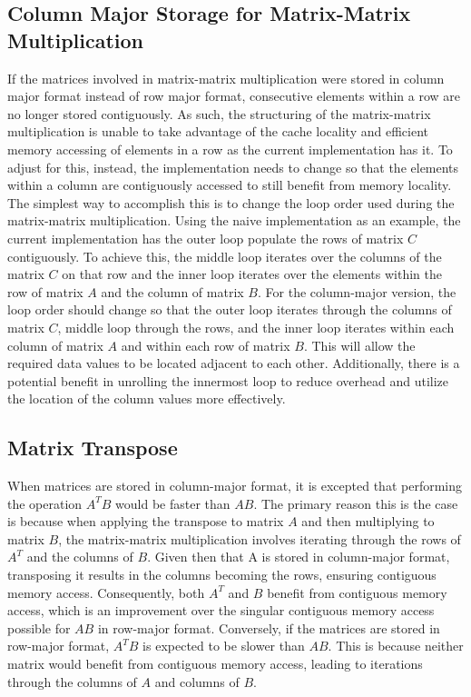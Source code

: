 \documentclass{article}
\begin{document}
\subsection{Column Major Storage for Matrix-Matrix Multiplication}
If the matrices involved in matrix-matrix multiplication were stored in column major format instead of row major format, consecutive elements within a row are no longer stored contiguously. As such, the structuring of the matrix-matrix multiplication is unable to take advantage of the cache locality and efficient memory accessing of elements in a row as the current implementation has it. To adjust for this, instead, the implementation needs to change so that the elements within a column are contiguously accessed to still benefit from memory locality. The simplest way to accomplish this is to change the loop order used during the matrix-matrix multiplication. Using the naive implementation as an example, the current implementation has the outer loop populate the rows of matrix \( C \) contiguously. To achieve this, the middle loop iterates over the columns of the matrix \( C \) on that row and the inner loop iterates over the elements within the row of matrix \( A \) and the column of matrix \( B \). For the column-major version, the loop order should change so that the outer loop iterates through the columns of matrix \( C \), middle loop through the rows, and the inner loop iterates within each column of matrix \( A \) and within each row of matrix \( B \). This will allow the required data values to be located adjacent to each other. Additionally, there is a potential benefit in unrolling the innermost loop to reduce overhead and utilize the location of the column values more effectively. 

\subsection{Matrix Transpose}
When matrices are stored in column-major format, it is excepted that performing the operation $A^{T}B$ would be faster than \( AB\). The primary reason this is the case is because when applying the transpose to matrix \( A\) and then multiplying to matrix \( B\), the matrix-matrix multiplication involves iterating through the rows of $A^{T}$ and the columns of \( B\). Given then that A is stored in column-major format, transposing it results in the columns becoming the rows, ensuring contiguous memory access. Consequently, both $A^{T}$ and \( B \) benefit from contiguous memory access, which is an improvement over the singular contiguous memory access possible for \(AB \) in row-major format. Conversely, if the matrices are stored in row-major format, $A^{T}B$ is expected to be slower than \(AB \). This is because neither matrix would benefit from contiguous memory access, leading to iterations through the columns of \( A\) and columns of \( B\).
\clearpage
\end{document}
